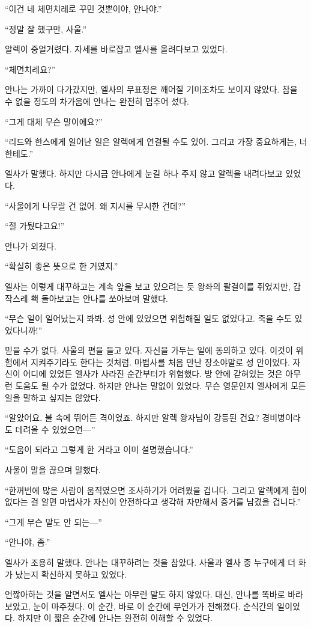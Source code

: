``이건 네 체면치레로 꾸민 것뿐이야, 안나야.''

``정말 잘 했구만, 사울.''

알렉이 중얼거렸다. 자세를 바로잡고 엘사를 올려다보고 있었다.

``체면치레요?''

안나는 가까이 다가갔지만, 엘사의 무표정은 깨어질 기미조차도 보이지 않았다. 참을 수 없을 정도의 차가움에 안나는 완전히 멈추어 섰다.

``그게 대체 무슨 말이에요?''

``리드와 한스에게 일어난 일은 알렉에게 연결될 수도 있어. 그리고 가장 중요하게는, 너한테도.''

엘사가 말했다. 하지만 다시금 안나에게 눈길 하나 주지 않고 알렉을 내려다보고 있었다.

``사울에게 나무랄 건 없어. 왜 지시를 무시한 건데?''

``절 가뒀다고요!''

안나가 외쳤다.

``확실히 좋은 뜻으로 한 거였지.''

엘사는 이렇게 대꾸하고는 계속 앞을 보고 있으려는 듯 왕좌의 팔걸이를 쥐었지만, 갑작스레 홱 돌아보고는 안나를 쏘아보며 말했다.

``무슨 일이 일어났는지 봐봐. 성 안에 있었으면 위험해질 일도 없었다고. 죽을 수도 있었다니까!''

믿을 수가 없다. 사울의 편을 들고 있다. 자신을 가두는 일에 동의하고 있다. 이것이 위험에서 지켜주기라도 한다는 것처럼. 마법사를 처음 만난 장소야말로 성 안이었다. 자신이 어디에 있었든 엘사가 사라진 순간부터가 위험했다. 방 안에 갇혀있는 것은 아무런 도움도 될 수가 없었다. 하지만 안나는 말없이 있었다. 무슨 영문인지 엘사에게 모든 일을 말하고 싶지는 않았다.

``알았어요. 불 속에 뛰어든 격이었죠. 하지만 알렉 왕자님이 강등된 건요? 경비병이라도 데려올 수 있었으면—''

``도움이 되라고 그렇게 한 거라고 이미 설명했습니다.''

사울이 말을 끊으며 말했다.

``한꺼번에 많은 사람이 움직였으면 조사하기가 어려웠을 겁니다. 그리고 알렉에게 힘이 없다는 걸 알면 마법사가 자신이 안전하다고 생각해 자만해서 증거를 남겼을 겁니다.''

``그게 무슨 말도 안 되는—''

``안나야, 좀.''

엘사가 조용히 말했다. 안나는 대꾸하려는 것을 참았다. 사울과 엘사 중 누구에게 더 화가 났는지 확신하지 못하고 있었다.

언짢아하는 것을 알면서도 엘사는 아무런 말도 하지 않았다. 대신, 안나를 똑바로 바라보았고, 눈이 마주쳤다. 이 순간, 바로 이 순간에 무언가가 전해졌다. 순식간의 일이었다. 하지만 이 짧은 순간에 안나는 완전히 이해할 수 있었다.

